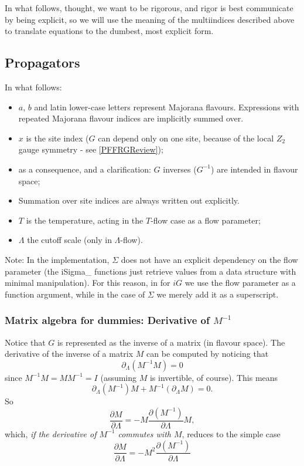 \documentclass{article}
\begin{document}
In what follows, thought, we want to be rigorous,
and rigor is best communicate by being explicit,
so we will use the meaning of the multiindices
described above
to translate equations to the dumbest, most explicit form.

\subsection{Propagators}

In what follows:
\begin{itemize}
\item $a$, $b$ and latin lower-case letters represent Majorana flavours. Expressions with repeated Majorana flavour indices are implicitly summed over.
\item $x$ is the site index ($G$ can depend only on one site, because of the local $Z_2$ gauge symmetry - see \ref{PFFRGReview});
\item as a consequence, and a clarification: $G$ inverses ($G^{-1}$) are intended in flavour space;
\item Summation over site indices are always written out explicitly.
\item $T$ is the temperature, acting in the $T$-flow case as a flow parameter;
\item $\Lambda$ the cutoff scale (only in $\Lambda$-flow).
\end{itemize}

Note: In the implementation, $\Sigma$ does not have an explicit dependency on the flow parameter
(the \textsf{iSigma\_} functions just retrieve values from a data structure with
minimal manipulation).
For this reason,
in for $iG$ we use the flow parameter as a function argument,
while in the case of $\Sigma$ we merely add it as a superscript.


\subsubsection{Matrix algebra for dummies: Derivative of $M^{-1}$}
Notice that $G$ is represented as the inverse of a matrix
(in flavour space).
The derivative of the inverse of a matrix $M$ can be computed by noticing that
\begin{equation}
  \partial_\Lambda\left(M^{-1}M\right) = 0
\end{equation}
since $M^{-1}M = M M^{-1} = I$ (assuming $M$ is invertible, of course).
This means
\begin{equation}
  \partial_\Lambda \left(M^{-1}\right)  M + M^{-1}\left(\partial_\Lambda M\right) = 0 .
\end{equation}
So
\begin{equation}
  \label{derivinv}
 \frac{\partial M}{\partial \Lambda} = - M \frac{\partial \left(M^{-1}\right)}{\partial \Lambda}  M,
\end{equation}
which,
\emph{if the derivative of $M^{-1}$ commutes with $M$},
reduces to the simple case
\begin{equation}
 \frac{\partial M}{\partial \Lambda} = - M^2 \frac{\partial \left(M^{-1}\right)}{\partial \Lambda}
\end{equation}
\end{document}
